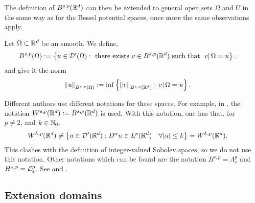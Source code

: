 \documentclass[
    a4paper,
    DIV=14,
    abstract=true,
    numbers=noenddot
]{scrartcl}
\begin{document}
The definition of $B^{s,p}(\mathbb{R}^d)$ can then be extended to general open sets $\Omega $ and  $U$ in the same way as for the Bessel potential spaces, once more the same observations apply.
\begin{definition}\label{besov def on U}
    Let $\Omega  \subset \mathbb{R}^d$ be an smooth. We define,
    \begin{align*}
        B^{s,p}(\Omega):=\left\{u \in \mathcal{D}^{\prime}(\Omega ): \text{ there exists } v \in B^{s,p}(\mathbb{R}^d) \text{ such that } \left.v\right|{\Omega }=u\right\},
    \end{align*}
    and give it the norm
    \begin{align*}
        \left\lVert u \right\rVert_{B^{s,p}(\Omega)}:= \inf \left\{\left\lVert v \right\rVert_{B^{s,p}(\mathbb{R}^d)}: \left.v\right|{\Omega }=u\right\}.
    \end{align*}
\end{definition}

\begin{observation}
    Different authors use different notations for these spaces. For example, in \cite{triebel1992theory}, the notation $W^{s,p}(\mathbb{R}^d):= B^{s,p}(\mathbb{R}^d)$ is used. With this notation, one has that, for $p \neq 2$, and $k \in \mathbb{N}_0$,
    \begin{align*}
        W^{k,p}(\mathbb{R}^d) \neq \left\{ u \in \mathcal{D}'(\mathbb{R}^d) : D^\alpha u \in L^p(\mathbb{R}^d) \quad \forall {\left| \alpha \right|}\leq   k\right\}= W^{k,p}(\mathbb{R}^d).
    \end{align*}
    This clashes with the definition of integer-valued Sobolev spaces, so we do not use this notation. Other notations which can be found are  the notation $B^{s,p}= \Lambda^{p}_s$ and $H^{s,p}= \mathcal{L} ^{p}_s$. See \cite{stein1970singular} and \cite{biccari2018local}.
\end{observation}

\subsection{Extension domains}
\end{document}
